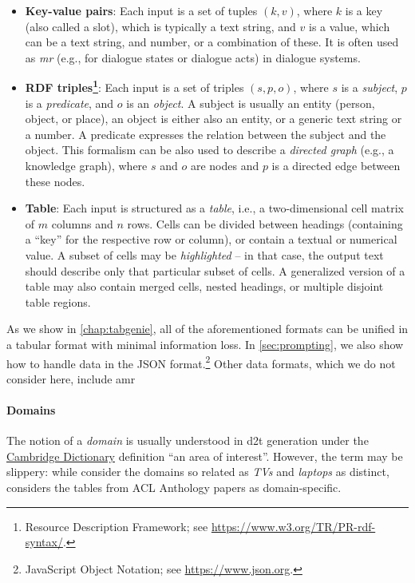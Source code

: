 \begin{itemize}
    \item \textbf{Key-value pairs}: Each input is a set of tuples $(k, v)$, where $k$ is a key (also called a slot), which is typically a text string, and $v$ is a value, which can be a text string, and number, or a combination of these. It is often used as \emph{\ac{mr}} (e.g., for dialogue states or dialogue acts) in dialogue systems.
    \item \textbf{RDF triples\footnote{Resource Description Framework; see \url{https://www.w3.org/TR/PR-rdf-syntax/}.}}: Each input is a set of triples $(s, p, o)$, where $s$ is a \emph{subject},  $p$ is a \emph{predicate}, and $o$ is an \textit{object}. A subject is usually an entity (person, object, or place), an object is either also an entity, or a generic text string or a number. A predicate expresses the relation between the subject and the object. This formalism can be also used to describe a \emph{directed graph} (e.g., a knowledge graph), where $s$ and $o$ are nodes and $p$ is a directed edge between these nodes.
    \item \textbf{Table}: Each input is structured as a \textit{table}, i.e., a two-dimensional cell matrix of $m$ columns and $n$ rows. Cells can be divided between headings (containing a ``key'' for the respective row or column), or contain a textual or numerical value. A subset of cells may be \emph{highlighted } -- in that case, the output text should describe only that particular subset of cells. A generalized version of a table may also contain merged cells, nested headings, or multiple disjoint table regions.
\end{itemize}

As we show in \autoref{chap:tabgenie}, all of the aforementioned formats can be unified in a tabular format with minimal information loss. In \autoref{sec:prompting}, we also show how to handle data in the JSON format.\footnote{JavaScript Object Notation; see \url{https://www.json.org}.} Other data formats, which we do not consider here, include \ac{amr}

\paragraph{Domains} The notion of a \emph{domain} is usually understood in \ac{d2t} generation under the \href{https://dictionary.cambridge.org/dictionary/english/domain}{Cambridge Dictionary} definition ``an area of interest''. However, the term may be slippery: while \citet{wen2016multi} consider the domains so related as \emph{TVs} and \emph{laptops} as distinct, \citet{lin2023survey} considers the tables from ACL Anthology papers \cite{suadaaTabletoTextGenerationNumerical2021} as domain-specific.


